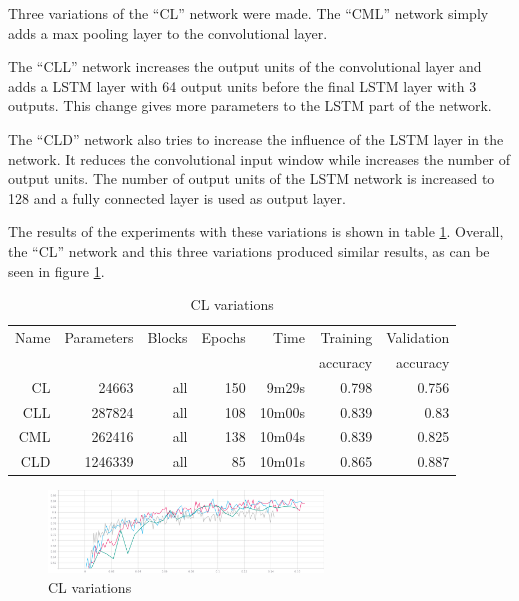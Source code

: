 
Three variations of the ``CL'' network were made.
The ``CML'' network simply adds a max pooling layer to the convolutional layer.

The ``CLL'' network increases the output units of the convolutional layer and adds a LSTM layer with 64 output units before the final LSTM layer with 3 outputs. This change gives more parameters to the LSTM part of the network.

The ``CLD'' network also tries to increase the influence of the LSTM layer in the network. It reduces the convolutional input window while increases the number of output units. The number of output units of the LSTM network is increased to 128 and a fully connected layer is used as output layer.

The results of the experiments with these variations is shown in table \ref{tab:carvingclvariations}.
Overall, the ``CL'' network and this three variations produced similar results, as can be seen in figure \ref{fig:cl-variations}.

\begin{table}[!ht]
    \centering
    \caption{CL variations}
    \label{tab:carvingclvariations}
\begin{tabular}{r|r|r|r|r|r|r}
\hline
Name & Parameters & Blocks & Epochs & Time    & Training          & Validation          \\       
     &            &        &        &         &          accuracy &            accuracy \\ \hline\hline

CL	    & 24663	    & all	& 150	& 9m29s	    & 0.798	& 0.756 \\\hline
CLL	    & 287824	& all	& 108	& 10m00s	& 0.839	& 0.83 \\\hline
CML	    & 262416	& all	& 138	& 10m04s	& 0.839	& 0.825 \\\hline
CLD	    & 1246339	& all	& 85	& 10m01s	& 0.865	& 0.887 \\\hline
\end{tabular}
\end{table}

\begin{figure}[htb!]
\centering\includegraphics[width=0.65\textwidth]{content/cl-variations.png}
\caption{\label{fig:cl-variations}CL variations}%
\end{figure}

